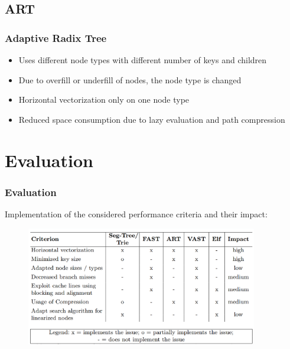 \documentclass{beamer}
\begin{document}
\subsection{ART}
\begin{frame}
	\frametitle{Adaptive Radix Tree}
	\begin{itemize}
		\item Uses different node types with different number of keys and children
		\item Due to overfill or underfill of nodes, the node type is changed
		\item Horizontal vectorization only on one node type
		\item Reduced space consumption due to lazy evaluation and path compression
	\end{itemize}
\end{frame}

\section{Evaluation}

\begin{frame}
\frametitle{Evaluation}
Implementation of the considered performance criteria and their impact:
\begin{figure}
	\includegraphics[width=0.9\textwidth]{img/table.png}
\end{figure}


\end{frame}
\end{document}
